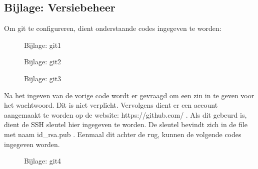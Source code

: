 \documentclass[12pt]{article} %
\begin{document}
\begin{BIJLAGE}
\newpage %



\section{Bijlage: Versiebeheer} \cite{git}

\setlength{\parindent}{0pt}Om git te configureren, dient onderstaande codes ingegeven te worden:
\begin{figure}[H] %
\caption{Bijlage: git1}
\label{Bijlage: git1}
\end{figure}

\vspace{5 mm}

\begin{figure}[H] %
\caption{Bijlage: git2}
\label{Bijlage: git2}
\end{figure}

\vspace{5 mm}

\begin{figure}[H] %
\caption{Bijlage: git3}
\label{Bijlage: git3}
\end{figure}

\vspace{5 mm}

\setlength{\parindent}{0pt}Na het ingeven van de vorige code wordt er gevraagd om een zin in te geven voor het wachtwoord. Dit is niet verplicht. Vervolgens dient er een account aangemaakt te worden op de website: https://github.com/ . Als dit gebeurd is, dient de SSH sleutel hier ingegeven te worden. De sleutel bevindt zich in de file met naam id\_rsa.pub . Eenmaal dit achter de rug, kunnen de volgende codes ingegeven worden.

\vspace{5 mm}

\begin{figure}[H] %
\caption{Bijlage: git4}
\label{Bijlage: git4}
\end{figure}


\end{BIJLAGE}
\end{document}
